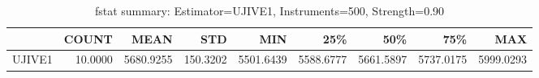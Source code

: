\begin{table}[ht]
\centering
\caption{fstat summary: Estimator=UJIVE1, Instruments=500, Strength=0.90}
\begin{tabular}{lrrrrrrrr}
\toprule
 & COUNT & MEAN & STD & MIN & 25\% & 50\% & 75\% & MAX \\
\midrule
UJIVE1 & 10.0000 & 5680.9255 & 150.3202 & 5501.6439 & 5588.6777 & 5661.5897 & 5737.0175 & 5999.0293 \\
\bottomrule
\end{tabular}
\end{table}
